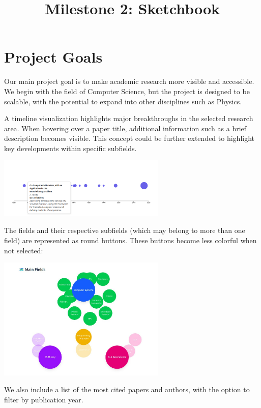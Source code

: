 \documentclass{article}
\title{Milestone 2: Sketchbook}
\begin{document}
\date{}
\maketitle

\section{Project Goals}
Our main project goal is to make academic research more visible and accessible.
We begin with the field of Computer Science, but the project is designed to be scalable, with the potential to expand into other disciplines such as Physics.

A timeline visualization highlights major breakthroughs in the selected research area.
When hovering over a paper title, additional information such as a brief description becomes visible.
This concept could be further extended to highlight key developments within specific subfields.

\begin{center}
\includegraphics[width=0.6\textwidth]{./pictures/timeline.png}
\end{center}

The fields and their respective subfields (which may belong to more than one field) are represented as round buttons. These buttons become less colorful when not selected:

\begin{center}
\includegraphics[width=0.6\textwidth]{./pictures/fields.jpeg}
\end{center}

We also include a list of the most cited papers and authors, with the option to filter by publication year.
\end{document}

